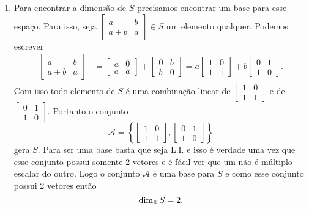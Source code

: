 \documentclass[12pt]{exam}
\begin{document}
\begin{enumerate}[label={\alph*})]
        \item Para encontrar a dimensão de $S$ precisamos encontrar um base para esse espaço. Para isso, seja $\begin{bmatrix}a & b\\ a + b & a\end{bmatrix} \in S$ um elemento qualquer. Podemos escrever
        \begin{align*}
            \begin{bmatrix}a & b\\a + b & a\end{bmatrix} &= \begin{bmatrix}a & 0\\a & a\end{bmatrix} + \begin{bmatrix}0 & b\\b & 0\end{bmatrix} = a\begin{bmatrix}1 & 0\\1 & 1\end{bmatrix} + b\begin{bmatrix}0 & 1\\1 & 0\end{bmatrix}.
        \end{align*}
        Com isso todo elemento de $S$ é uma combinação linear de $\begin{bmatrix}1 & 0\\1 & 1\end{bmatrix}$ e de $\begin{bmatrix}0 & 1\\1 & 0\end{bmatrix}$. Portanto o conjunto
        \[
            \mathcal{A} = \left\{\begin{bmatrix}1 & 0\\1 & 1\end{bmatrix}, \begin{bmatrix}0 & 1\\1 & 0\end{bmatrix}\right\}
        \]
        gera $S$. Para ser uma base basta que seja L.I. e isso é verdade uma vez que esse conjunto possui somente 2 vetores e é fácil ver que um não é múltiplo escalar do outro. Logo o conjunto $\mathcal{A}$ é uma base para $S$ e como esse conjunto possui 2 vetores então
        \[
            \dim_{\mathbb{R}} S = 2.
        \]


\end{enumerate}
\end{document}

